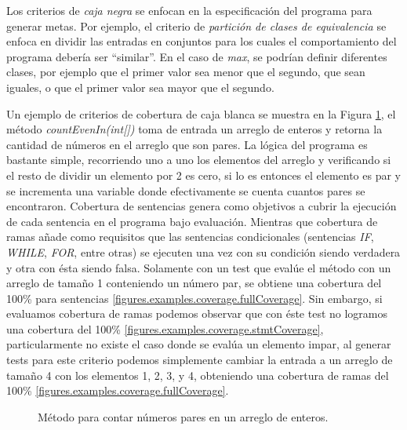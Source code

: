 Los criterios de \emph{caja negra} se enfocan en la especificaci\'on del programa para generar metas. Por ejemplo, el criterio de \emph{partici\'on de clases de equivalencia} se enfoca en dividir las entradas en conjuntos para los cuales el comportamiento del programa deber\'ia ser ``similar''. En el caso de \emph{max}, se podr\'ian definir diferentes clases, por ejemplo que el primer valor sea menor que el segundo, que sean iguales, o que el primer valor sea mayor que el segundo. 

Un ejemplo de criterios de cobertura de caja blanca se muestra en la Figura \ref{figures.code.coverageExample}, el m\'etodo \emph{countEvenIn(int[])} toma de entrada un arreglo de enteros y retorna la cantidad de n\'umeros en el arreglo que son pares. La l\'ogica del programa es bastante simple, recorriendo uno a uno los elementos del arreglo y verificando si el resto de dividir un elemento por 2 es cero, si lo es entonces el elemento es par y se incrementa una variable donde efectivamente se cuenta cuantos pares se encontraron. Cobertura de sentencias genera como objetivos a cubrir la ejecuci\'on de cada sentencia en el programa bajo evaluaci\'on. Mientras que cobertura de ramas a\~nade como requisitos que las sentencias condicionales (sentencias \emph{IF}, \emph{WHILE}, \emph{FOR}, entre otras) se ejecuten una vez con su condici\'on siendo verdadera y otra con \'esta siendo falsa. Solamente con un test que eval\'ue el m\'etodo con un arreglo de tama\~no 1 conteniendo un n\'umero par, se obtiene una cobertura del 100\% para sentencias \ref{figures.examples.coverage.fullCoverage}. Sin embargo, si evaluamos cobertura de ramas podemos observar que con \'este test no logramos una cobertura del 100\% \ref{figures.examples.coverage.stmtCoverage}, particularmente no existe el caso donde se eval\'ua un elemento impar, al generar tests para este criterio podemos simplemente cambiar la entrada a un arreglo de tama\~no 4 con los elementos 1, 2, 3, y 4, obteniendo una cobertura de ramas del 100\% \ref{figures.examples.coverage.fullCoverage}.

\begin{figure}
	
	\caption{M\'etodo para contar n\'umeros pares en un arreglo de enteros.}
	\label{figures.code.coverageExample}
\end{figure}

